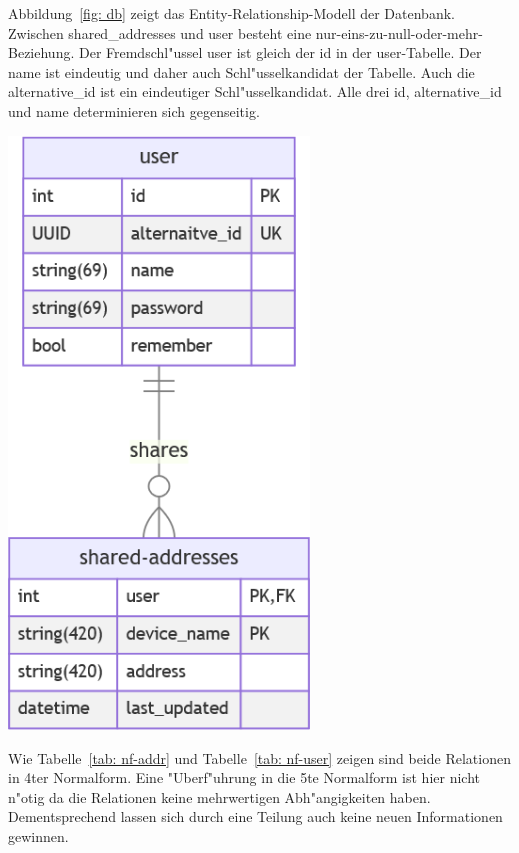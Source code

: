 \begin{minipage}{0.425\textwidth}
    Abbildung~\ref{fig: db} zeigt das Entity-Relationship-Modell der Datenbank.
    Zwischen shared\_addresses und user besteht eine nur-eins-zu-null-oder-mehr-Beziehung.
    Der Fremdschl{"u}ssel user ist gleich der id in der user-Tabelle.
    Der name ist eindeutig und daher auch Schl{"u}sselkandidat der Tabelle.
    Auch die alternative\_id ist ein eindeutiger Schl{"u}sselkandidat.
    Alle drei id, alternative\_id und name determinieren sich gegenseitig.
\end{minipage}
\hspace{0.05\textwidth}
\begin{minipage}{0.425\textwidth}
    \centering
    \includegraphics[width=0.6\textwidth]{db}
    \label{fig: db}
\end{minipage}

\vspace{2cm}



Wie Tabelle~\ref{tab: nf-addr} und Tabelle~\ref{tab: nf-user} zeigen sind beide Relationen in 4ter Normalform.
Eine {"U}berf{"u}hrung in die 5te Normalform ist hier nicht n{"o}tig da die Relationen keine mehrwertigen Abh{"a}ngigkeiten haben.
Dementsprechend lassen sich durch eine Teilung auch keine neuen Informationen gewinnen.

